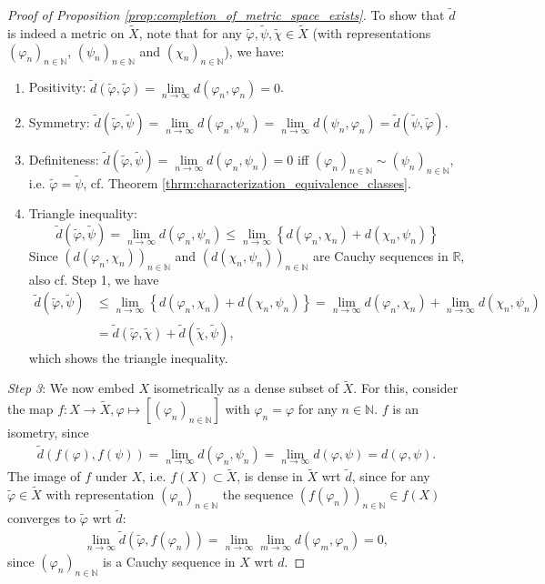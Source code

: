 \documentclass[12pt, a4paper]{article}
\numberwithin{equation}{section}
\theoremstyle{definition}
\theoremstyle{definition}
\newcommand{\seq}[1][\varphi]{\left( #1 \right)_{n \in \mathbb{N}}}
\begin{document}
\begin{proof}[Proof of Proposition \ref{prop:completion_of_metric_space_exists}]
		To show that $\tilde{d}$ is indeed a metric on $\tilde{X}$, note that for any $\tilde{\varphi}, \tilde{\psi}, \tilde{\chi}\in \tilde{X}$ (with representations $\seq[\varphi_n]$, $\seq[\psi_n]$ and $\seq[\chi_n]$), we have:
		\begin{enumerate}
			\item Positivity: $\tilde d\left(\tilde{\varphi}, \tilde{\varphi}\right) = \lim\limits_{n\to\infty} d(\varphi_n, \varphi_n) = 0$.
			\item Symmetry: $\tilde d\left(\tilde{\varphi}, \tilde{\psi}\right) = \lim\limits_{n\to\infty} d(\varphi_n, \psi_n) = \lim\limits_{n\to\infty} d(\psi_n, \varphi_n) = \tilde{d}\left(\tilde{\psi}, \tilde{\varphi}\right)$.
			\item Definiteness: $\tilde d\left(\tilde{\varphi}, \tilde{\psi}\right) = \lim\limits_{n\to\infty}d(\varphi_n, \psi_n) = 0$ iff $\seq[\varphi_n]\sim\seq[\psi_n]$, i.e. $\tilde{\varphi} = \tilde{\psi}$, cf. Theorem \ref{thrm:characterization_equivalence_classes}.
			\item Triangle inequality: $$\tilde{d}\left(\tilde{\varphi}, \tilde{\psi}\right) = \lim\limits_{n\to\infty}d(\varphi_n, \psi_n) \leq \lim\limits_{n\to\infty}\left\{d(\varphi_n, \chi_n) + d(\chi_n, \psi_n)\right\}$$ Since $\seq[d(\varphi_n, \chi_n)]$ and $\seq[d(\chi_n, \psi_n)]$ are Cauchy sequences in $\mathbb R$, also cf. Step 1, we have 
			\begin{align*}
				\tilde{d}\left(\tilde{\varphi}, \tilde{\psi}\right) &\leq \lim\limits_{n\to\infty}\left\{d(\varphi_n, \chi_n) + d(\chi_n, \psi_n)\right\} = \lim\limits_{n\to\infty}d(\varphi_n, \chi_n) + \lim\limits_{n\to\infty}d(\chi_n, \psi_n) 
				\\ &= \tilde{d}\left(\tilde{\varphi}, \tilde{\chi}\right) + \tilde{d}\left(\tilde{\chi}, \tilde{\psi}\right),
			\end{align*}
			which shows the triangle inequality.
		\end{enumerate}
		\textit{Step 3}: We now embed $X$ isometrically as a dense subset of $\tilde{X}$. For this, consider the map $f: X\to\tilde{X}, \varphi\mapsto \left[\seq[\varphi_n]\right]$ with $\varphi_n = \varphi$ for any $n\in\mathbb N$. $f$ is an isometry, since 
		\begin{align}
			\tilde{d}\left(f(\varphi), f(\psi)\right) = \lim\limits_{n\to\infty} d\left(\varphi_n, \psi_n\right) = \lim\limits_{n\to\infty}d(\varphi, \psi) = d(\varphi, \psi).
		\end{align}
		The image of $f$ under $X$, i.e. $f(X)\subset \tilde{X}$, is dense in $\tilde{X}$ wrt $\tilde{d}$, since for any $\tilde{\varphi}\in\tilde{X}$ with representation $\seq[\varphi_n]$ the sequence $\seq[f(\varphi_n)]\in f(X)$ converges to $\tilde{\varphi}$ wrt $\tilde{d}$:
		\begin{align}
			\lim\limits_{n\to\infty}\tilde{d}\left(\tilde{\varphi}, f(\varphi_n)\right) = \lim\limits_{n\to\infty}\lim\limits_{m\to\infty}d(\varphi_m, \varphi_n) = 0,
		\end{align}
		since $\seq[\varphi_n]$ is a Cauchy sequence in $X$ wrt $d$.
		

\end{proof}
\end{document}
